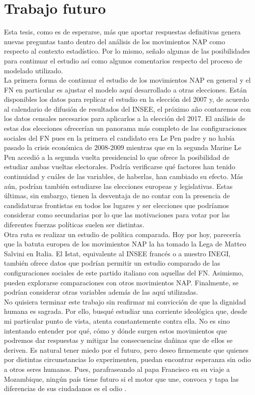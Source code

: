 \section*{Trabajo futuro}

Esta tesis, como es de esperarse, más que aportar respuestas definitivas genera nuevas preguntas tanto dentro del análisis de los movimientos NAP como respecto al contexto estadístico. Por lo mismo, señalo algunas de las posibilidades para continuar el estudio así como algunos comentarios respecto del proceso de modelado utilizado.\\

La primera forma de continuar el estudio de los movimientos NAP en general y el FN en particular es ajustar el modelo aquí desarrollado a otras elecciones. Están disponibles los datos para replicar el estudio en la elección del 2007 y, de acuerdo al calendario de difusión de resultados del INSEE, el próximo año contaremos con los datos censales necesarios para aplicarlos a la elección del 2017. El análisis de estas dos elecciones ofrecerían un panorama más completo de las configuraciones sociales del FN pues en la primera el candidato era Le Pen padre y no había pasado la crisis económica de 2008-2009 mientras que en la segunda Marine Le Pen accedió a la segunda vuelta presidencial lo que ofrece la posibilidad de estudiar ambas vueltas electorales. Podría verificarse qué factores han tenido continuidad y cuáles de las variables, de haberlas, han cambiado su efecto. Más aún, podrían también estudiarse las elecciones europeas y legislativas. Estas últimas, sin embargo, tienen la desventaja de no contar con la presencia de candidaturas frontistas en todos los lugares y ser elecciones que podríamos considerar como secundarias por lo que las motivaciones para votar por las diferentes fuerzas políticas suelen ser distintas.\\

Otra ruta es realizar un estudio de política comparada. Hoy por hoy, parecería que la batuta europea de los movimientos NAP la ha tomado la Lega de Matteo Salvini en Italia. El Istat, equivalente al INSEE francés o a nuestro INEGI, también ofrece datos que podrían permitir un estudio comparado de las configuraciones sociales de este partido italiano con aquellas del FN. Asimismo, pueden explorarse comparaciones con otros movimientos NAP. Finalmente, se podrían considerar otras variables además de las aquí utilizadas.\\

No quisiera terminar este trabajo sin reafirmar mi convicción de que la dignidad humana es sagrada. Por ello, busqué estudiar una corriente ideológica que, desde mi particular punto de vista, atenta constantemente contra ella. No es sino intentando entender por qué, cómo y dónde surgen estos movimientos que podremos dar respuestas y mitigar las consecuencias dañinas que de ellos se deriven. Es natural tener miedo por el futuro, pero deseo firmemente que quienes por distintas circunstancias lo experimenten, puedan encontrar esperanza sin odio a otros seres humanos. Pues, parafraseando al papa Francisco en su viaje a Mozambique, ningún país tiene futuro si el motor que une, convoca y tapa las diferencias de sus ciudadanos es el odio \parencite{Francisco}.
 
 
